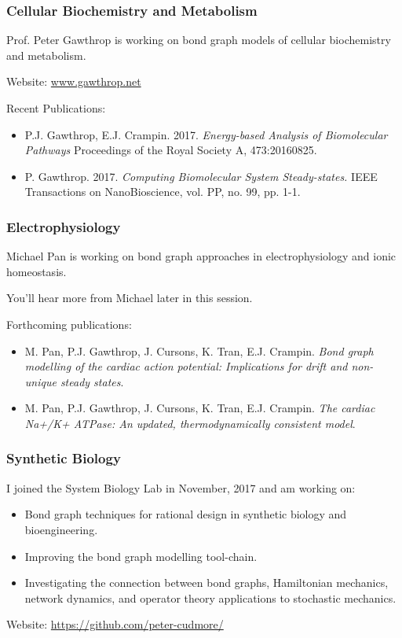 \begin{frame}
\frametitle{Cellular Biochemistry and Metabolism}

Prof. Peter Gawthrop is working on bond graph models of cellular biochemistry and metabolism.\\
\vspace{10pt}

Website: \url{www.gawthrop.net}
\vspace{10pt}

Recent Publications:
\begin{itemize}
	\itemsep1em
	\item  P.J. Gawthrop, E.J. Crampin. 2017. \emph{Energy-based Analysis of Biomolecular Pathways}
	Proceedings of the Royal Society A, 473:20160825.
	\item P. Gawthrop. 2017. \emph{Computing Biomolecular System Steady-states.}
	 IEEE Transactions on NanoBioscience, vol. PP, no. 99, pp. 1-1. 
\end{itemize}


\end{frame}
\begin{frame}
\frametitle{Electrophysiology}
Michael Pan is working on bond graph approaches in electrophysiology and ionic homeostasis. \\
\vspace{10pt}

You'll hear more from Michael later in this session.\\
\vspace{10pt}

Forthcoming publications:
\begin{itemize}
	\itemsep1em
	\item M. Pan, P.J. Gawthrop, J. Cursons, K. Tran, E.J. Crampin. \emph{Bond graph modelling of the cardiac action potential: Implications for drift and non-unique steady states}.
	\item M. Pan, P.J. Gawthrop, J. Cursons, K. Tran, E.J. Crampin.
	\emph{The cardiac Na+/K+ ATPase: An updated, thermodynamically consistent model}.
\end{itemize}
\end{frame}
\begin{frame}
\frametitle{Synthetic Biology}
I joined the System Biology Lab in November, 2017 and am working on:
\begin{itemize}
	\itemsep1em
	\item Bond graph techniques for rational design in synthetic biology and bioengineering.
	\item Improving the bond graph modelling tool-chain. 
	\item Investigating the connection between bond graphs, Hamiltonian mechanics, network dynamics, and operator theory applications to stochastic mechanics.
\end{itemize}
\vspace{10pt}


Website: \url{https://github.com/peter-cudmore/}

\end{frame}



